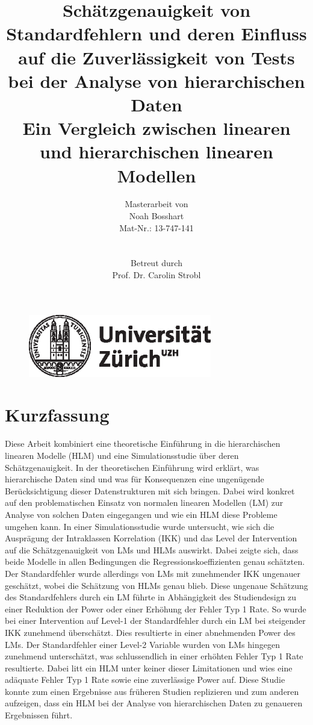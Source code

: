 \documentclass[12pt]{article}\usepackage[]{graphicx}\usepackage[]{color}
\title{Schätzgenauigkeit von Standardfehlern und deren Einfluss auf die Zuverlässigkeit von Tests bei der Analyse von hierarchischen Daten \\ \large{Ein Vergleich zwischen linearen und hierarchischen linearen Modellen}}
\author{Masterarbeit von \\ Noah Bosshart \\ Mat-Nr.: 13-747-141 \\ \\ \\ Betreut durch \\ Prof. Dr. Carolin Strobl}
\begin{document}


\begin{figure}[t]
  \centering
  \includegraphics[width = 8cm]{./figures/uzh_logo.eps}
\end{figure}

\maketitle
\thispagestyle{empty}

\newpage
{}
\tableofcontents

\newpage
\listoffigures

\newpage
\listoftables
\newpage


\section*{Kurzfassung}
Diese Arbeit kombiniert eine theoretische Einführung in die hierarchischen linearen Modelle (HLM) und  eine Simulationsstudie über deren Schätzgenauigkeit. In der theoretischen Einführung wird erklärt, was hierarchische Daten sind und was für Konsequenzen eine ungenügende Berücksichtigung dieser Datenstrukturen mit sich bringen. Dabei wird konkret auf den problematischen Einsatz von normalen linearen Modellen (LM) zur Analyse von solchen Daten eingegangen und wie ein HLM diese Probleme umgehen kann. In einer Simulationsstudie wurde untersucht, wie sich die Ausprägung der Intraklassen Korrelation (IKK) und das Level der Intervention auf die Schätzgenauigkeit von LMs und HLMs auswirkt. Dabei zeigte sich, dass beide Modelle in allen Bedingungen die Regressionskoeffizienten genau schätzten. Der Standardfehler wurde allerdings von LMs mit zunehmender IKK ungenauer geschätzt, wobei die Schätzung von HLMs genau blieb. Diese ungenaue Schätzung des Standardfehlers durch ein LM führte in Abhängigkeit des Studiendesign zu einer Reduktion der Power oder einer Erhöhung der Fehler Typ 1 Rate. So wurde bei einer Intervention auf Level-1 der Standardfehler durch ein LM bei steigender IKK zunehmend überschätzt. Dies resultierte in einer abnehmenden Power des LMs. Der Standardfehler einer Level-2 Variable wurden von LMs hingegen zunehmend unterschätzt, was schlussendlich in einer erhöhten Fehler Typ 1 Rate resultierte. Dabei litt ein HLM unter keiner dieser Limitationen und wies eine adäquate Fehler Typ 1 Rate sowie eine zuverlässige Power auf. Diese Studie konnte zum einen Ergebnisse aus früheren Studien replizieren und zum anderen aufzeigen, dass ein HLM bei der Analyse von hierarchischen Daten zu genaueren Ergebnissen führt.
\end{document}
